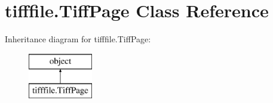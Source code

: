 \hypertarget{classtifffile_1_1_tiff_page}{\section{tifffile.\-Tiff\-Page Class Reference}
\label{classtifffile_1_1_tiff_page}
}
Inheritance diagram for tifffile.\-Tiff\-Page\-:\begin{figure}[H]
\begin{center}
\leavevmode
\includegraphics[height=2.000000cm]{classtifffile_1_1_tiff_page}
\end{center}
\end{figure}
